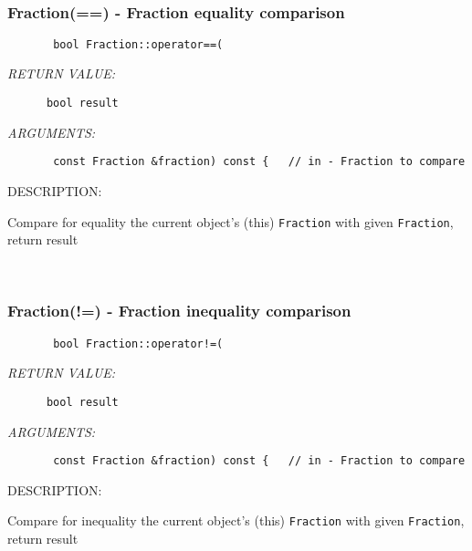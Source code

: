  
\mbox{}\hrulefill\ 
 
\subsubsection [Fraction(==)] {Fraction(==) - Fraction equality comparison}


  
\begin{verbatim}       bool Fraction::operator==(\end{verbatim}{\em RETURN VALUE:}
\begin{verbatim}      bool result\end{verbatim}{\em ARGUMENTS:}
\begin{verbatim}       const Fraction &fraction) const {   // in - Fraction to compare\end{verbatim}
{\sf DESCRIPTION:\\ }


        Compare for equality the current object's (this) {\tt Fraction}
        with given {\tt Fraction}, return result
   
 
\mbox{}\hrulefill\ 
 
\subsubsection [Fraction(!=)] {Fraction(!=) - Fraction inequality comparison}


  
\begin{verbatim}       bool Fraction::operator!=(\end{verbatim}{\em RETURN VALUE:}
\begin{verbatim}      bool result\end{verbatim}{\em ARGUMENTS:}
\begin{verbatim}       const Fraction &fraction) const {   // in - Fraction to compare\end{verbatim}
{\sf DESCRIPTION:\\ }


        Compare for inequality the current object's (this)
        {\tt Fraction} with given {\tt Fraction}, return result
   
 
